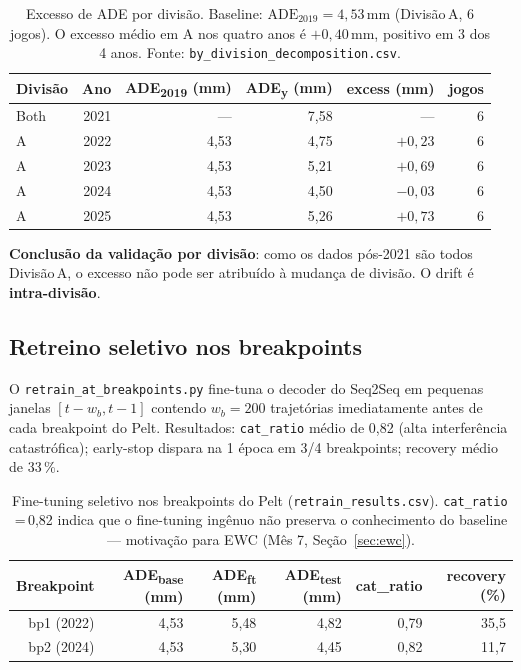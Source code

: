 \documentclass[11pt,a4paper]{article}
\begin{document}
\begin{table}[H]
\centering\small
\begin{tabular}{l r r r r r}
\toprule
\textbf{Divis\~ao} & \textbf{Ano}
    & \textbf{ADE\textsubscript{2019} (mm)} & \textbf{ADE\textsubscript{y} (mm)}
    & \textbf{excess (mm)} & \textbf{jogos} \\
\midrule
Both & 2021 & ---  & 7{,}58 & ---       & 6 \\
A    & 2022 & 4{,}53 & 4{,}75 & $+0{,}23$ & 6 \\
A    & 2023 & 4{,}53 & 5{,}21 & $+0{,}69$ & 6 \\
A    & 2024 & 4{,}53 & 4{,}50 & $-0{,}03$ & 6 \\
A    & 2025 & 4{,}53 & 5{,}26 & $+0{,}73$ & 6 \\
\bottomrule
\end{tabular}
\caption{Excesso de ADE por divis\~ao. Baseline:
         $\mathrm{ADE}_{2019} = 4{,}53$\,mm (Divis\~ao\,A, 6 jogos).
         O excesso m\'edio em A nos quatro anos \'e $+0{,}40$\,mm,
         positivo em 3 dos 4 anos. Fonte:
         \texttt{by\_division\_decomposition.csv}.}
\label{tab:division}
\end{table}

\textbf{Conclus\~ao da valida\c{c}\~ao por divis\~ao}: como os dados
p\'os-2021 s\~ao todos Divis\~ao\,A, o excesso n\~ao pode ser
atribu\'ido \`a mudan\c{c}a de divis\~ao. O drift \'e
\textbf{intra-divis\~ao}.

\subsection{Retreino seletivo nos breakpoints}

O \texttt{retrain\_at\_breakpoints.py} fine-tuna o decoder do Seq2Seq
em pequenas janelas $[t-w_b, t-1]$ contendo $w_b\!=\!200$ trajet\'orias
imediatamente antes de cada breakpoint do Pelt. Resultados:
\texttt{cat\_ratio} m\'edio de 0{,}82 (alta interfer\^encia
catastr\'ofica); early-stop dispara na 1\textordfeminine{} \'epoca em
3/4 breakpoints; recovery m\'edio de 33\,\%.

\begin{table}[H]
\centering\small
\begin{tabular}{r r r r r r}
\toprule
\textbf{Breakpoint} & \textbf{ADE\textsubscript{base} (mm)} & \textbf{ADE\textsubscript{ft} (mm)}
                    & \textbf{ADE\textsubscript{test} (mm)} & \textbf{cat\_ratio} & \textbf{recovery (\%)} \\
\midrule
bp1 (2022) & 4{,}53 & 5{,}48 & 4{,}82 & 0{,}79 & 35{,}5 \\
bp2 (2024) & 4{,}53 & 5{,}30 & 4{,}45 & 0{,}82 & 11{,}7 \\
\bottomrule
\end{tabular}
\caption{Fine-tuning seletivo nos breakpoints do Pelt
         (\texttt{retrain\_results.csv}). \texttt{cat\_ratio}\,=\,0{,}82
         indica que o fine-tuning ing\^enuo n\~ao preserva o
         conhecimento do baseline --- motiva\c{c}\~ao para EWC
         (M\^es 7, Se\c{c}\~ao~\ref{sec:ewc}).}
\label{tab:retrain}
\end{table}
\end{document}
